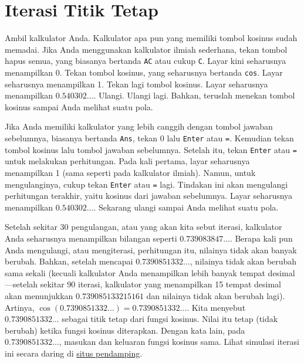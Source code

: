 
\section{\label{sec:Fixedpt}Iterasi Titik Tetap
}

Ambil kalkulator Anda. Kalkulator apa pun yang memiliki tombol kosinus
sudah memadai. Jika Anda menggunakan kalkulator ilmiah sederhana,
tekan tombol hapus semua, yang biasanya bertanda \texttt{AC} atau
cukup \texttt{C}. Layar kini seharusnya menampilkan 0. Tekan tombol
kosinus, yang seharusnya bertanda \texttt{cos}. Layar seharusnya menampilkan
1. Tekan lagi tombol kosinus. Layar seharusnya menampilkan $0.540302\ldots$.
Ulangi. Ulangi lagi. Bahkan, teruslah menekan tombol kosinus sampai
Anda melihat suatu pola. 

Jika Anda memiliki kalkulator yang lebih canggih dengan tombol jawaban
sebelumnya, biasanya bertanda \texttt{Ans}, tekan 0 lalu \texttt{Enter}
atau \texttt{=}. Kemudian tekan tombol kosinus lalu tombol jawaban
sebelumnya. Setelah itu, tekan \texttt{Enter} atau \texttt{=} untuk
melakukan perhitungan. Pada kali pertama, layar seharusnya menampilkan
1 (sama seperti pada kalkulator ilmiah). Namun, untuk mengulanginya,
cukup tekan \texttt{Enter} atau \texttt{=} lagi. Tindakan ini akan
mengulangi perhitungan terakhir, yaitu kosinus dari jawaban sebelumnya.
Layar seharusnya menampilkan $0.540302\ldots$. Sekarang ulangi sampai
Anda melihat suatu pola.

Setelah sekitar 30 pengulangan, atau yang akan kita sebut iterasi,
kalkulator Anda seharusnya menampilkan bilangan seperti $0.739083847\ldots$.
Berapa kali pun Anda mengulangi, atau mengiterasi, perhitungan itu,
nilainya tidak akan banyak berubah. Bahkan, setelah mencapai $0.7390851332\ldots$,
nilainya tidak akan berubah sama sekali (kecuali kalkulator Anda menampilkan
lebih banyak tempat desimal---setelah sekitar 90 iterasi, kalkulator
yang menampilkan 15 tempat desimal akan menunjukkan $0.739085133215161$
dan nilainya tidak akan berubah lagi). Artinya, $\cos(0.7390851332\ldots)=0.7390851332\ldots$.
Kita menyebut $0.7390851332\ldots$ sebagai  titik
tetap dari fungsi kosinus. Nilai itu tetap (tidak berubah) ketika
fungsi kosinus diterapkan. Dengan kata lain, pada $0.7390851332\ldots$,
masukan dan keluaran fungsi kosinus sama. Lihat simulasi iterasi ini
secara daring di \href{http://lqbrin.github.io/tea-time-numerical/ancillaries.html}{situs pendamping}.

